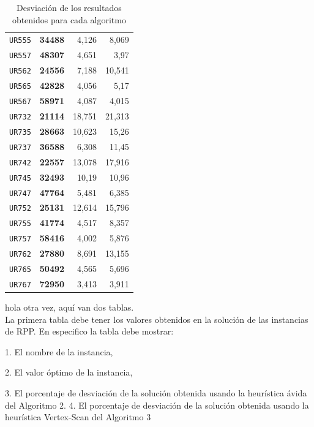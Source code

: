 \documentclass[11pt]{article}
\begin{document}
\begin{table}[htbp]
\begin{center}
\begin{tabular}{|r|r|r|r|}
   \texttt{UR555} & \textbf{34488} &  4,126 & 8,069 \\ 
   \texttt{UR557} & \textbf{48307} &  4,651 & 3,97 \\ 
   \texttt{UR562} & \textbf{24556} &  7,188 & 10,541 \\ 
   \texttt{UR565} & \textbf{42828} &  4,056 & 5,17 \\ 
   \texttt{UR567} & \textbf{58971} &  4,087 & 4,015 \\ 
   \texttt{UR732} & \textbf{21114} & 18,751 & 21,313 \\ 
   \texttt{UR735} & \textbf{28663} & 10,623 & 15,26 \\ 
   \texttt{UR737} & \textbf{36588} &  6,308 & 11,45 \\ 
   \texttt{UR742} & \textbf{22557} & 13,078 & 17,916 \\ 
   \texttt{UR745} & \textbf{32493} &  10,19 & 10,96 \\ 
   \texttt{UR747} & \textbf{47764} &  5,481 & 6,385 \\ 
   \texttt{UR752} & \textbf{25131} & 12,614 & 15,796 \\ 
   \texttt{UR755} & \textbf{41774} &  4,517 & 8,357 \\ 
   \texttt{UR757} & \textbf{58416} &  4,002 & 5,876 \\ 
   \texttt{UR762} & \textbf{27880} &  8,691 & 13,155 \\ 
   \texttt{UR765} & \textbf{50492} &  4,565 & 5,696 \\ 
   \texttt{UR767} & \textbf{72950} &  3,413 & 3,911 \\ \hline
   \end{tabular}
   \end{center}
   \caption{Desviación de los resultados obtenidos para cada algoritmo}
   \label{tablaDesv}
   \end{table}
   
hola otra vez, aquí van dos tablas. \\

La primera tabla debe tener los valores obtenidos en la solución de las instancias de
RPP. En especifico la tabla debe mostrar:

1. El nombre de la instancia,

2. El valor óptimo de la instancia,

3. El porcentaje de desviación de la solución obtenida usando la heurística ávida del
Algoritmo 2.
4. El porcentaje de desviación de la solución obtenida usando la heurística Vertex-Scan
del Algoritmo 3
\end{document}
